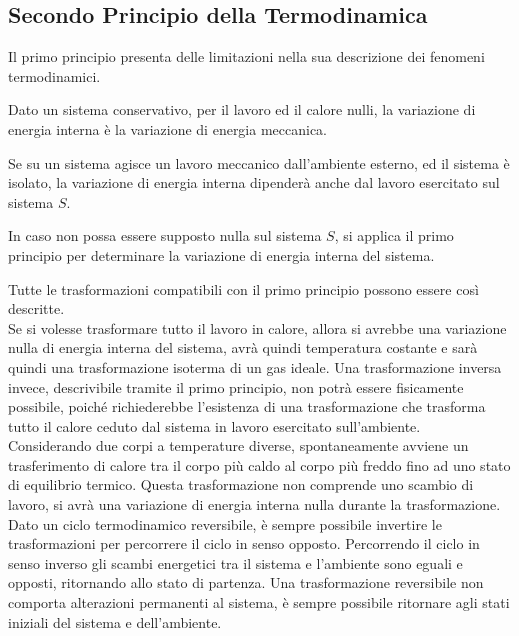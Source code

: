\documentclass{article}
\numberwithin{equation}{subsection}
\begin{document}
\subsection{Secondo Principio della Termodinamica}


Il primo principio presenta delle limitazioni 
nella sua descrizione dei fenomeni termodinamici. 



Dato un sistema conservativo, per il lavoro ed il calore nulli, la variazione di energia interna è la variazione di energia meccanica. 



Se su un sistema agisce un lavoro meccanico dall'ambiente esterno, ed il sistema è isolato, la variazione di energia interna dipenderà anche dal lavoro esercitato sul 
sistema $S$. 



In caso non possa essere supposto nulla sul sistema $S$, si applica il primo principio per determinare la variazione di energia interna del sistema.



Tutte le trasformazioni compatibili con il primo principio possono essere così descritte. 
\\
Se si volesse trasformare tutto il 
lavoro in calore, allora si avrebbe una variazione nulla di energia 
interna del sistema, avrà quindi temperatura costante e sarà 
quindi una trasformazione isoterma di un gas ideale. Una 
trasformazione inversa invece, descrivibile tramite il primo 
principio, non potrà essere fisicamente possibile, poiché 
richiederebbe l'esistenza di una trasformazione che trasforma 
tutto il calore ceduto dal sistema in lavoro esercitato sull'ambiente. 
\\
Considerando due corpi a temperature diverse, spontaneamente 
avviene un trasferimento di calore tra il corpo più caldo al 
corpo più freddo fino ad uno stato di equilibrio 
termico. Questa trasformazione non comprende uno 
scambio di lavoro, si avrà una variazione di energia 
interna nulla durante la trasformazione. 
\\
Dato un ciclo termodinamico reversibile, è sempre possibile invertire le trasformazioni per percorrere il ciclo in senso opposto. Percorrendo 
il ciclo in senso inverso gli scambi energetici tra il sistema e l'ambiente sono eguali e opposti, ritornando allo stato di partenza. Una trasformazione reversibile non 
comporta alterazioni permanenti al sistema, è sempre possibile ritornare agli stati iniziali del sistema e dell'ambiente. 
\end{document}
